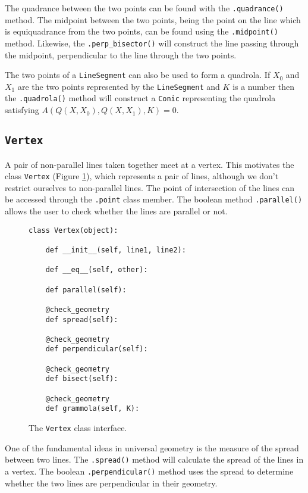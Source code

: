 The quadrance between the two points can be found with the \texttt{.quadrance()} method.
The midpoint between the two points, being the point on the line which is equiquadrance from the two points, can be found using the \texttt{.midpoint()} method.
Likewise, the \texttt{.perp\_bisector()} will construct the line passing through the midpoint, perpendicular to the line through the two points.

The two points of a \texttt{LineSegment} can also be used to form a quadrola.
If $X_0$ and $X_1$ are the two points represented by the \texttt{LineSegment} and $K$ is a number then the \texttt{.quadrola()} method will construct a \texttt{Conic} representing the quadrola satisfying $A(Q(X, X_0), Q(X, X_1), K) = 0$.


\subsection{\texttt{Vertex}}

A pair of non-parallel lines taken together meet at a vertex.
This motivates the \pygeom class \texttt{Vertex} (Figure \ref{fig:vertex}), which represents a pair of lines, although we don't restrict ourselves to non-parallel lines.
The point of intersection of the lines can be accessed through the \texttt{.point} class member.
The boolean method \texttt{.parallel()} allows the user to check whether the lines are parallel or not.

\begin{figure}[!hbt]
\begin{verbatim}
class Vertex(object):

    def __init__(self, line1, line2):

    def __eq__(self, other):

    def parallel(self):

    @check_geometry
    def spread(self):

    @check_geometry
    def perpendicular(self):

    @check_geometry
    def bisect(self):

    @check_geometry
    def grammola(self, K):
\end{verbatim}
\caption{The \texttt{Vertex} class interface.}\label{fig:vertex}
\end{figure}

One of the fundamental ideas in universal geometry is the measure of the spread between two lines.
The \texttt{.spread()} method will calculate the spread of the lines in a vertex.
The boolean \texttt{.perpendicular()} method uses the spread to determine whether the two lines are perpendicular in their geometry.

